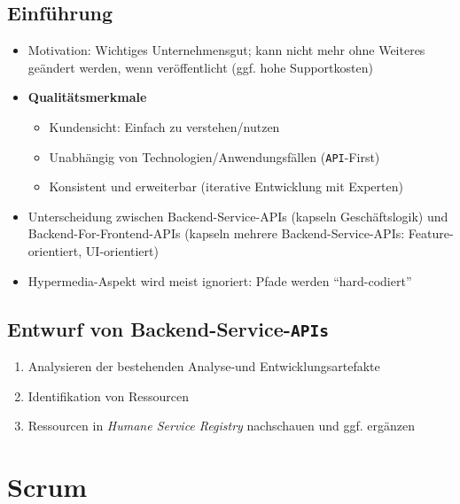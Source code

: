 \subsection{Einführung}
\begin{itemize}
	\item Motivation: Wichtiges Unternehmensgut; kann nicht mehr ohne Weiteres geändert werden, wenn veröffentlicht (ggf. hohe Supportkosten)
	\item \textbf{Qualitätsmerkmale}
	\begin{itemize}
		\item Kundensicht: Einfach zu verstehen/nutzen
		\item Unabhängig von Technologien/Anwendungsfällen (\texttt{API}-First)
		\item Konsistent und erweiterbar (iterative Entwicklung mit Experten)
	\end{itemize}
	\item Unterscheidung zwischen Backend-Service-APIs (kapseln Geschäftslogik) und Backend-For-Frontend-APIs (kapseln mehrere Backend-Service-APIs: Feature-orientiert, UI-orientiert)
	\item Hypermedia-Aspekt wird meist ignoriert: Pfade werden "`hard-codiert"'
\end{itemize}

\subsection{Entwurf von Backend-Service-\texttt{APIs}}
\begin{enumerate}
	\item Analysieren der bestehenden Analyse-und Entwicklungsartefakte
	\item Identifikation von Ressourcen
	\item Ressourcen in \textit{Humane Service Registry} nachschauen und ggf. ergänzen
\end{enumerate}



\section{Scrum}

